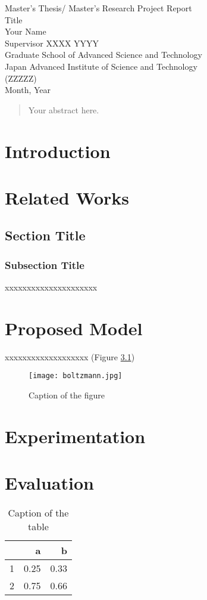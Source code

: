 \documentclass[12pt,a4paper]{report}
\begin{document}
\thispagestyle{empty}
\begin{center}
Master's Thesis/ Master's Research Project Report\\%
\vfill
Title\\
\vfill
Your Name\\
\vfill
Supervisor  XXXX YYYY\\
\vfill
Graduate School of Advanced Science and Technology\\ %
Japan Advanced Institute of Science and Technology\\
(ZZZZZ)\\ %
\vfill
Month, Year\\ %
\vfill
\end{center}
\clearpage
\begin{abstract}
Your abstract here.
\end{abstract}
\tableofcontents\thispagestyle{empty}
\listoffigures\thispagestyle{empty}
\listoftables\thispagestyle{empty}

\setcounter{page}{0}
\chapter{Introduction}
\chapter{Related Works}
\section{Section Title}
\subsection{Subsection Title}
xxxxxxxxxxxxxxxxxxxxx\cite{ref1,ref3}
\chapter{Proposed Model}
xxxxxxxxxxxxxxxxxxx (Figure \ref{fig1})
\begin{figure}
\centerline{\texttt{[image: boltzmann.jpg]}}
\caption{Caption of the figure}\label{fig1}
\end{figure}
\chapter{Experimentation}
\chapter{Evaluation}
\begin{table}
\centering
\begin{tabular}{r|rr}
& a & b\\ \hline
1& 0.25 & 0.33\\
2& 0.75 & 0.66\\
\end{tabular}
\caption{Caption of the table}\label{table1}
\end{table}
\end{document}
